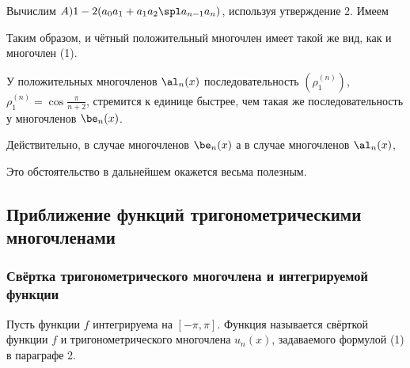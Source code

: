 \documentclass[a4paper]{article}
\begin{document}
Вычислим $A)1 - 2(a_0a_1 + a_1a_2 \spl a_{n-1} a_n)$, используя
утверждение 2. Имеем 

Таким образом,  и
чётный положительный многочлен  имеет такой же вид,
как и многочлен (1).

У положительных многочленов $\al_n(x)$ последовательность
$(\rho^{(n)}_1)$, $\rho_1^{(n)} = \cos\frac{\pi}{n+2}$, стремится к
единице быстрее, чем такая же последовательность у многочленов
$\be_n(x)$.

Действительно, в случае многочленов $\be_n(x)$  а в случае многочленов
$\al_n(x)$, 

Это обстоятельство в дальнейшем окажется весьма полезным.

\subsection{Приближение функций тригонометрическими многочленами}
\subsubsection{Свёртка тригонометрического многочлена и
интегрируемой функции}

Пусть функции $f$ интегрируема на $[-\pi,\pi]$. Функция
 называется свёрткой функции
$f$ и тригонометрического многочлена $u_n(x)$, задаваемого формулой
(1) в параграфе 2.
\end{document}
